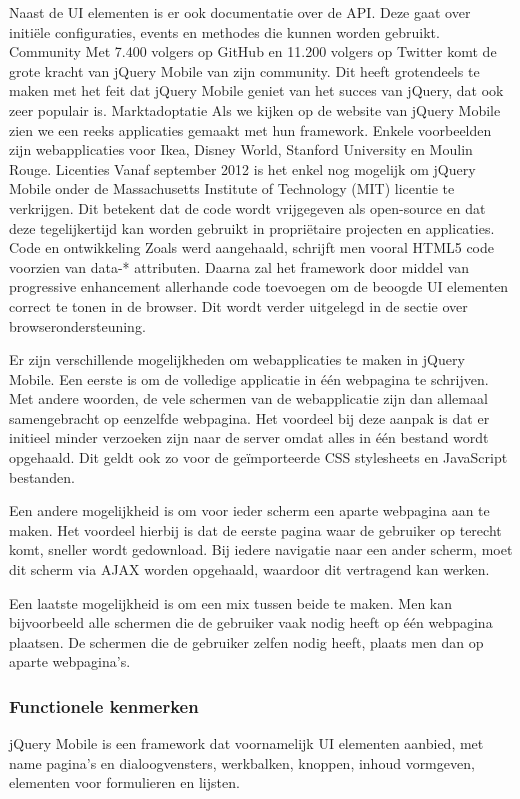 Naast de UI elementen is er ook documentatie over de API. Deze gaat over initiële configuraties, events en methodes die kunnen worden gebruikt.
Community
Met 7.400 volgers op GitHub en 11.200 volgers op Twitter komt de grote kracht van jQuery Mobile van zijn community. Dit heeft grotendeels te maken met het feit dat jQuery Mobile geniet van het succes van jQuery, dat ook zeer populair is.
Marktadoptatie
Als we kijken op de website van jQuery Mobile zien we een reeks applicaties gemaakt met hun framework. Enkele voorbeelden zijn webapplicaties voor Ikea, Disney World, Stanford University en Moulin Rouge. 
Licenties
Vanaf september 2012 is het enkel nog mogelijk om jQuery Mobile onder de Massachusetts Institute of Technology (MIT) licentie te verkrijgen. Dit betekent dat de code wordt vrijgegeven als open-source en dat deze tegelijkertijd kan worden gebruikt in propriëtaire projecten en applicaties.
Code en ontwikkeling
Zoals werd aangehaald, schrijft men vooral HTML5 code voorzien van data-* attributen. Daarna zal het framework door middel van progressive enhancement allerhande code toevoegen om de beoogde UI elementen correct te tonen in de browser. Dit wordt verder uitgelegd in de sectie over browserondersteuning.

Er zijn verschillende mogelijkheden om webapplicaties te maken in jQuery Mobile. Een eerste is om de volledige applicatie in één webpagina te schrijven. Met andere woorden,  de vele schermen van de webapplicatie zijn dan allemaal samengebracht op eenzelfde webpagina. Het voordeel bij deze aanpak is dat er initieel minder verzoeken zijn naar de server omdat alles in één bestand wordt opgehaald. Dit geldt ook zo voor de geïmporteerde CSS stylesheets en JavaScript bestanden. 

Een andere mogelijkheid is om voor ieder scherm een aparte webpagina aan te maken. Het voordeel hierbij is dat de eerste pagina waar de gebruiker op terecht komt, sneller wordt gedownload. Bij iedere navigatie naar een ander scherm, moet dit scherm via AJAX worden opgehaald, waardoor dit vertragend kan werken. 

Een laatste mogelijkheid is om een mix tussen beide te maken. Men kan bijvoorbeeld alle schermen die de gebruiker vaak nodig heeft op één webpagina plaatsen. De schermen die de gebruiker zelfen nodig heeft, plaats men dan op aparte webpagina's.  

\subsubsection{Functionele kenmerken}
jQuery Mobile is een framework dat voornamelijk UI elementen aanbied, met name pagina's en dialoogvensters, werkbalken, knoppen, inhoud vormgeven, elementen voor formulieren en lijsten.

